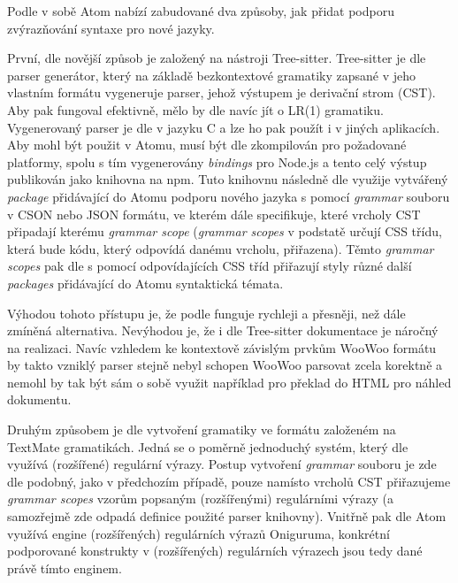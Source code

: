 Podle \cite{atom-docs} v sobě Atom nabízí zabudované dva způsoby, jak přidat podporu zvýrazňování syntaxe pro nové
jazyky.

První, dle \cite{atom-docs} novější způsob je založený na nástroji Tree-sitter. Tree-sitter je dle \cite
{tree-sitter-docs} parser generátor, který na základě bezkontextové gramatiky zapsané v jeho vlastním formátu vygeneruje
parser, jehož výstupem je derivační strom (CST). Aby pak fungoval efektivně, mělo by dle \cite{tree-sitter-docs} navíc
jít o LR(1) gramatiku. Vygenerovaný parser je dle \cite{tree-sitter-docs} v jazyku C a lze ho pak použít i v jiných
aplikacích. Aby mohl být použit v Atomu, musí být dle \cite{atom-docs} zkompilován pro požadované platformy, spolu s tím
vygenerovány \textit{bindings} pro Node.js a tento celý výstup publikován jako knihovna na npm. Tuto knihovnu následně
dle \cite{atom-docs} využije vytvářený \textit{package} přidávající do Atomu podporu nového jazyka s pomocí \textit
{grammar} souboru v CSON nebo JSON formátu, ve kterém dále specifikuje, které vrcholy CST připadají kterému \textit
{grammar scope} (\textit{grammar scopes} v podstatě určují CSS třídu, která bude kódu, který odpovídá danému vrcholu,
přiřazena). Těmto \textit{grammar scopes} pak dle \cite{atom-docs} s pomocí odpovídajících CSS tříd přiřazují styly
různé další \textit{packages} přidávající do Atomu syntaktická témata.

Výhodou tohoto přístupu je, že podle \cite{atom-docs} funguje rychleji a přesněji, než dále zmíněná alternativa.
Nevýhodou je, že i dle Tree-sitter dokumentace \cite{tree-sitter-docs} je náročný na realizaci. Navíc vzhledem ke
kontextově závislým prvkům WooWoo formátu by takto vzniklý parser stejně nebyl schopen WooWoo parsovat zcela korektně a
nemohl by tak být sám o sobě využit například pro překlad do HTML pro náhled dokumentu.

Druhým způsobem je dle \cite{atom-docs} vytvoření gramatiky ve formátu založeném na TextMate gramatikách. Jedná se o
poměrně jednoduchý systém, který dle \cite{atom-docs} využívá (rozšířené) regulární výrazy. Postup vytvoření \textit
{grammar} souboru je zde dle \cite{atom-docs} podobný, jako v předchozím případě, pouze namísto vrcholů CST přiřazujeme
\textit{grammar scopes} vzorům popsaným (rozšířenými) regulárními výrazy (a samozřejmě zde odpadá definice použité
parser knihovny). Vnitřně pak dle \cite{atom-docs} Atom využívá engine (rozšířených) regulárních výrazů Oniguruma,
konkrétní podporované konstrukty v (rozšířených) regulárních výrazech jsou tedy dané právě tímto enginem.

